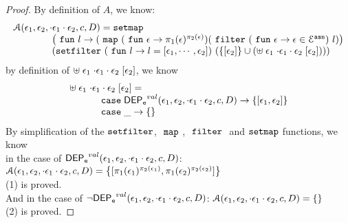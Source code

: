 \begin{proof}
By definition of $A$, we know:
%
\[
	\begin{array}{l}
	\mathcal{A}(\event_1, \event_2, \cdot \event_1 \cdot \event_2, c, D)
	= 
	\kw{setmap} ~
	\\ \qquad \qquad
	\left(\efun l \to ( \emap 
		(\efun  \event \to \pi_1(\event)^{\pi_2(\event)})
	(\efilter 
		(\efun \event \to  \event \in \eventset^{\asn}) ~ l) \right)
	\\ \qquad \qquad
	(\kw{setfilter} ~
		(\efun l \to l = [\event_1, \cdots, \event_2]) ~ 
		\left(\left\{[\event_2]\right\} \cup \left(  {\uplus} \eapp \event_1 \eapp {\cdot \event_1 \cdot \event_2} \eapp [\event_2] \right) \right))
	\end{array}
\]
by definition of $ {\uplus} \; \mathtt{\epsilon}_1 \; {\cdot \mathtt{\epsilon}_1 \cdot \mathtt{\epsilon}_2} \; [\mathtt{\epsilon}_2]  $, we know 
\[
	\begin{array}{l}
	{\uplus} \eapp \event_1 \eapp {\cdot \event_1 \cdot \event_2} \eapp [\event_2] 
	=   
	\\ \quad \qquad 	
	\ecase \eventdep^{val}(\event_1, \event_2, \cdot \event_1 \cdot \event_2, c, D)
	\to \left\{ [\event_1, \event_2] \right\}
	\\ \quad \qquad 	
	\ecase \_
	\to \left\{ \right\}
\end{array}
\]
%
By simplification of the $\mathtt{setfilter}$, $~\mathtt{map}~$, $~\mathtt{filter}~$ and $\mathtt{setmap}$ functions, we know
\\
in the case of $\mathsf{DEP_{\mathtt{e}}}^{val}(\mathtt{\epsilon}_1, \mathtt{\epsilon}_2, \cdot \mathtt{\epsilon}_1 \cdot \mathtt{\epsilon}_2, c, D)$:
$\mathcal{A}(\event_1, \event_2, \cdot \event_1 \cdot \event_2, c, D) = 
  \left\{[\pi_1(\event_1)^{\pi_2(\event_1)}, \pi_1(\event_2)^{\pi_2(\event_2)}] \right \}$
\\
(1) is proved.
\\
And in the case of $\neg \mathsf{DEP_{\mathtt{e}}}^{val}(\mathtt{\epsilon}_1, \mathtt{\epsilon}_2, \cdot \mathtt{\epsilon}_1 \cdot \mathtt{\epsilon}_2, c, D)$: 
$\mathcal{A}(\event_1, \event_2, \cdot  \event_1 \cdot \event_2, c, D) = 
  \left\{ \right \}$
\\
(2) is proved.
\end{proof}
%
%
%

